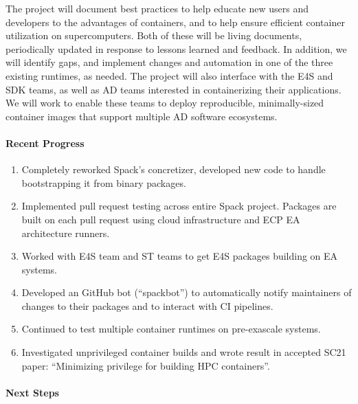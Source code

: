 The project will document best practices 
to help educate new users and developers to the advantages of containers,
and to help ensure efficient container
utilization on supercomputers. Both of these will be living
documents, periodically updated in response to lessons learned and
feedback.  In addition, we will identify gaps, and implement changes and
automation in one of the three existing runtimes, as needed.  The project
will also interface with the E4S and SDK teams, as well as AD teams
interested in containerizing their applications. We will work to enable
these teams to deploy reproducible, minimally-sized container images that
support multiple AD software ecosystems.

\paragraph{Recent Progress}

\begin{enumerate}
\item Completely reworked Spack's concretizer, developed new code to
      handle bootstrapping it from binary packages.

\item Implemented pull request testing across entire Spack project. Packages
      are built on each pull request using cloud infrastructure and
      ECP EA architecture runners.

\item Worked with E4S team and ST teams to get E4S packages building on
      EA systems.

\item Developed an GitHub bot (``spackbot'') to automatically notify
      maintainers of changes to their packages and to interact with CI pipelines.

\item Continued to test multiple container runtimes on pre-exascale systems.

\item Investigated unprivileged container builds and wrote result in accepted
      SC21 paper: ``Minimizing privilege for building HPC containers''.

\end{enumerate}

\paragraph{Next Steps}

